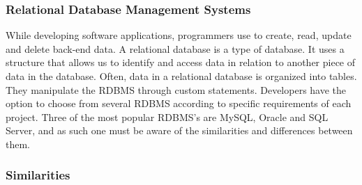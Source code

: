 \subsubsection{Relational Database Management Systems}
While developing software applications, programmers use  to create, read, update and delete back-end data. A relational database is a type of database. It uses a structure that allows us to identify and access data in relation to another piece of data in the database. Often, data in a relational database is organized into tables. They manipulate the RDBMS through custom  statements. Developers have the option to choose from several RDBMS according to specific requirements of each project. Three of the most popular RDBMS's are MySQL, Oracle and  SQL Server, and as such one must be aware of the similarities and differences between them. 

\subsubsection{Similarities}

